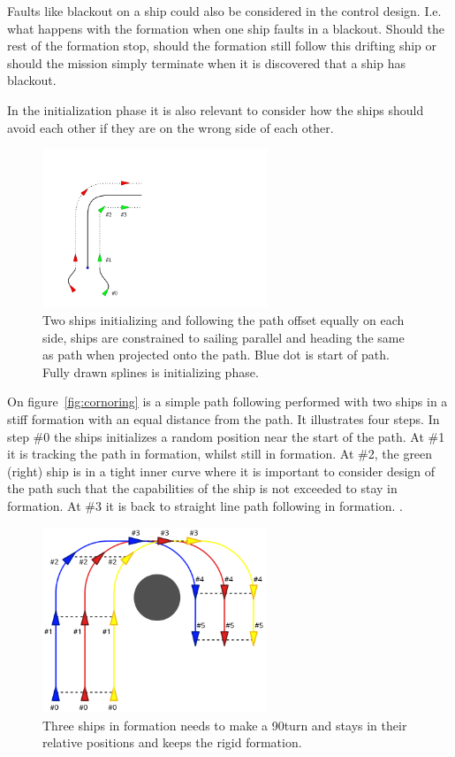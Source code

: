 Faults like blackout on a ship could also be considered in the control
design. I.e. what happens with the formation when one ship faults in a
blackout. Should the rest of the formation stop, should the formation
still follow this drifting ship or should the mission simply terminate
when it is discovered that a ship has blackout.

In the initialization phase it is also relevant to consider how the
ships should avoid each other if they are on the wrong side of each
other.

\begin{figure}[htbp]
	\centering
	\includegraphics[width=0.6\textwidth]{fig/cornoring}
	\caption{Two ships initializing and following the path offset
		equally on each side, ships are constrained to sailing parallel
		and heading the same as path when projected onto the path. Blue
	dot is start of path. Fully drawn splines is initializing phase.}
	\label{fig:cornoring}
\end{figure}

On figure~\vref{fig:cornoring} is a simple path following performed
with two ships in a stiff formation with an equal distance from the
path. It illustrates four steps. In step \#0 the ships initializes a
random position near the start of the path. At \#1 it is tracking the
path in formation, whilst still in formation. At \#2, the green
(right) ship is in a tight inner curve where it is important to
consider design of the path such that the capabilities of the ship is not
exceeded to stay in formation. At \#3 it is back to straight line path
following in formation. \citep{thorvaldsen}.

\begin{figure}[htbp]
	\centering
	\includegraphics[width=0.6\textwidth]{fig/form_rigid_90}
	\caption{Three ships in formation needs to make a 90\textdegree turn and stays in their relative positions and keeps the rigid formation.}
	\label{fig:form_rigid_90}
\end{figure}

